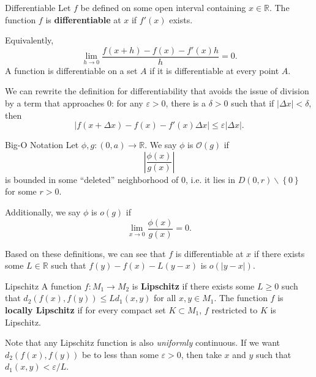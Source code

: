 \documentclass[10pt]{report}
\begin{document}
\begin{defn}{Differentiable}{}
	Let $f$ be defined on some open interval containing $x \in \mathbb{R}$. The function $f$ is \textbf{differentiable} at $x$ if $f'(x)$ exists.

	Equivalently,
	\[
		\lim_{h \to 0} \frac{f(x+h) - f(x) -f'(x) h}{h} = 0.
	\] 
	A function is differentiable on a set $A$ if it is differentiable at every point $A$.
\end{defn}

We can rewrite the definition for differentiability that avoids the issue of division by a term that approaches 0: for any $\varepsilon>0$, there is a $\delta>0$ such that if $|\Delta x|< \delta$, then
\[
	|f(x + \Delta x) - f(x) - f'(x) \Delta x| \leq \varepsilon |\Delta x|.
\] 

\begin{defn}{Big-O Notation}{}
	Let $\phi,g:(0,a) \to \mathbb{R}$. We say $\phi$ is $\mathcal{O}(g)$ if
	 \[
		 \left|\frac{\phi(x)}{g(x)} \right|
	 \] is bounded in some ``deleted'' neighborhood of 0, i.e. it lies in $D(0,r)\backslash\left\{ 0 \right\}$ for some $r>0$.

	 Additionally, we say $\phi$ is $o(g)$ if \[\lim_{x \to 0} \frac{\phi(x)}{g(x)} = 0.\]
\end{defn}

Based on these definitions, we can see that $f$ is differentiable at $x$ if there exists some $L \in \mathbb{R}$ such that $f(y)-f(x)-L(y-x)$ is $o(|y-x|)$.

\begin{defn}{Lipschitz}{}
	A function $f:M_1\to M_2$ is \textbf{Lipschitz} if there exists some $L \geq 0$ such that $d_2(f(x), f(y)) \leq L d_1(x,y)$ for all $x,y \in M_1$. The function $f$ is \textbf{locally Lipschitz} if for every compact set $K \subset M_1$, $f$ restricted to $K$ is Lipschitz.
\end{defn}

Note that any Lipschitz function is also \textit{uniformly} continuous. If we want $d_2(f(x),f(y))$ be to less than some $\varepsilon>0$, then take $x$ and $y$ such that $d_1(x,y) < \varepsilon/L$.
\end{document}
